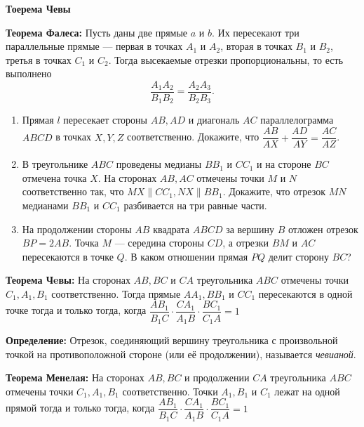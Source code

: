 \documentclass{article}
\begin{document}
\large


\begin{center}
\textbf{Тоерема Чевы}
\end{center}


\textbf{Теорема Фалеса:} Пусть даны две прямые  $a$ и $b$. Их пересекают три параллельные прямые — первая в точках $A_1$ и $A_2$, вторая в точках $B_1$ и $B_2$, третья в точках $C_1$ и $C_2$. Тогда высекаемые отрезки пропорциональны, то есть выполнено
$$\frac{A_1A_2}{B_1B_2} =\frac{A_2A_3}{B_2B_3}.$$
\begin{enumerate}[label*=\protect\fbox{\arabic{enumi}}]

\item Прямая $l$ пересекает стороны $AB, AD$ и диагональ $AC$ параллелограмма $ABCD$ в точках $X, Y, Z$ соответственно. Докажите, что $\dfrac{AB}{AX} + \dfrac{AD}{AY} = \dfrac{AC}{AZ}$.

\item В треугольнике $ABC$ проведены медианы $BB_1$ и $CC_1$ и на стороне $BC$ отмечена точка $X$. На сторонах $AB, AC$ отмечены точки $M$ и $N$ соответственно так, что $MX \parallel CC_1, NX \parallel BB_1$. Докажите, что отрезок $MN$ медианами $BB_1$ и $CC_1$ разбивается на три равные части.

\item На продолжении стороны $AB$ квадрата $ABCD$ за вершину $B$ отложен отрезок $BP = 2AB$. Точка $M$ — середина стороны $CD$, а отрезки $BM$ и $AC$ пересекаются в точке $Q$. В каком отношении прямая $PQ$ делит сторону $BC$?
\end{enumerate}


\textbf{Теорема Чeвы:} На сторонах $AB, BC$ и $CA$ треугольника $ABC$ отмечены точки $C_1, A_1, B_1$ соответственно. Тогда прямые $AA_1, BB_1$ и $CC_1$ пересекаются в одной точке тогда и только тогда, когда
$\dfrac{AB_1}{B_1C}\cdot \dfrac{CA_1}{A_1B} \cdot\dfrac{BC_1}{C_1A} = 1$

\textbf{Определение:} Отрезок, соединяющий вершину треугольника с произвольной точкой на противоположной стороне (или её продолжении), называется \textit{чевианой}.

\textbf{Теорема Менелая:} На сторонах $AB, BC$ и продолжении $CA$ треугольника $ABC$ отмечены точки $C_1, A_1, B_1$ соответственно. Точки $A_1, B_1$ и $C_1$ лежат на одной прямой тогда и только тогда, когда
$\dfrac{AB_1}{B_1C}\cdot \dfrac{CA_1}{A_1B} \cdot\dfrac{BC_1}{C_1A} = 1$
\end{document}
